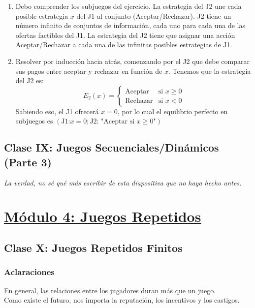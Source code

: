 \documentclass{article}
\begin{document}
                \begin{enumerate}
                    \item Debo comprender los subjuegos del ejercicio.
                    \subitem La estrategia del J2 une cada posible estrategia $x$ del J1 al conjunto (Aceptar/Rechazar).
                    \subitem J2 tiene un número infinito de conjuntos de información, cada uno para cada una de las ofertas factibles del J1.
                    \subitem La estrategia del J2 tiene que asignar una acción Aceptar/Rechazar a cada una de las infinitas posibles estrategias de J1.
                    \item Resolver por inducción hacia atrás, comenzando por el J2 que debe comparar sus pagos entre aceptar y rechazar en función de $x$.
                    \subitem Tenemos que la estrategia del J2 es:
                    \[
                        E_{2}(x) =
                        \begin{cases} 
                            \text{Aceptar} & \text{si } x \geq 0 \\ 
                            \text{Rechazar} & \text{si } x < 0
                        \end{cases}
                    \]
                    \subitem Sabiendo eso, el J1 ofrecerá $x = 0$, por lo cual el equilibrio perfecto en subjuegos es \((\text{J1:} x = 0; \text{J2: "Aceptar si } x \geq 0 \text{"})\)
                \end{enumerate}
        \subsection*{Clase IX: Juegos Secuenciales/Dinámicos (Parte 3)}
            \textit{La verdad, no sé qué más escribir de esta diapositiva que no haya hecho antes.}
    \section*{\underline{Módulo 4: Juegos Repetidos}}
        \subsection*{Clase X: Juegos Repetidos Finitos}
            \subsubsection*{Aclaraciones}
                En general, las relaciones entre los jugadores duran más que un juego. \\
                Como existe el futuro, nos importa la reputación, los incentivos y los castigos.
\end{document}
